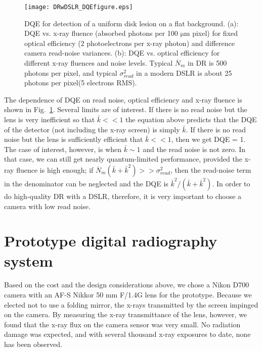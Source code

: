 \begin{figure}[h]
\centering
\texttt{[image: DRwDSLR\_DQEfigure.eps]}
\caption{DQE for detection of a uniform disk lesion on a flat background. (a): DQE vs. x-ray fluence (absorbed photons per 100 $\mathrm{\mu m}$ pixel) for fixed optical efficiency (2 photoelectrons per x-ray photon) and difference camera read-noise variances. (b): DQE vs. optical efficiency for different x-ray fluences and noise levels. Typical $\overline{N}_m$ in DR is 500 photons per pixel, and typical $\sigma_{read}^2$ in a modern DSLR is about 25 photons per pixel(5 electrons RMS).}
\label{fig:DQE}
\end{figure}

The dependence of DQE on read noise, optical efficiency and x-ray fluence is shown in Fig.~\ref{fig:DQE}. Several limits are of interest. If there is no read noise but the lens is very inefficient so that $\bar{k} << 1$ the equation above predicts that the DQE of the detector (not including the x-ray screen) is simply $\bar{k}$.  If there is no read noise but the lens is sufficiently efficient that $\bar{k} << 1$, then we get DQE = 1. The case of interest, however, is when $\bar{k} \sim 1$ and the read noise is not zero. In that case, we can still get nearly quantum-limited performance, provided the x-ray fluence is high enough; if $\overline{N}_m(\bar{k}+\bar{k}^2) >> \sigma_{read}^2$, then the read-noise term in the denominator can be neglected and the DQE is $\bar{k}^2/(\bar{k}+\bar{k}^2)$. In order to do high-quality DR with a DSLR, therefore, it is very important to choose a camera with low read noise.

\section{Prototype digital radiography system}
Based on the cost and the design considerations above, we chose a Nikon D700 camera with an AF-S Nikkor 50 mm F/1.4G lens for the prototype.  Because we elected not to use a folding mirror, the x-rays transmitted by the screen impinged on the camera. By measuring the x-ray transmittance of the lens, however, we found that the x-ray flux on the camera sensor was very small. No radiation damage was expected, and with several thousand x-ray exposures to date, none has been observed.

